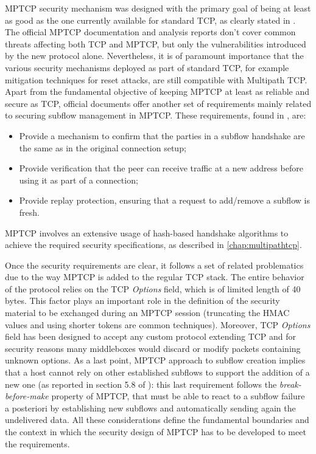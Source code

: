 MPTCP security mechanism was designed with the primary goal of being at least as good as the one currently available for standard TCP, as clearly stated in . The official MPTCP documentation and analysis reports don't cover common threats affecting both TCP and MPTCP, but only the vulnerabilities introduced by the new protocol alone. Nevertheless, it is of paramount importance that the various security mechanisms deployed as part of standard TCP, for example mitigation techniques for reset attacks, are still compatible with Multipath TCP. Apart from the fundamental objective of keeping MPTCP at least as reliable and secure as TCP, official documents offer another set of requirements mainly related to securing subflow management in MPTCP. These requirements, found in , are:
\begin{itemize} 
\item Provide a mechanism to confirm that the parties in a subflow handshake are the same as in the original connection setup;
\item Provide verification that the peer can receive traffic at a new address before using it as part of a connection;
\item Provide replay protection, ensuring that a request to add/remove a subflow is fresh.
\end{itemize}

MPTCP involves an extensive usage of hash-based handshake algorithms to achieve the required security specifications, as described in \autoref{chap:multipathtcp}. 

Once the security requirements are clear, it follows a set of related problematics due to the way MPTCP is added to the regular TCP stack. The entire behavior of the protocol relies on the TCP \textit{Options} field, which is of limited length of 40 bytes. This factor plays an important role in the definition of the security material to be exchanged during an MPTCP session (truncating the HMAC values and using shorter tokens are common techniques). Moreover, TCP \textit{Options} field has been designed to accept any custom protocol extending TCP and for security reasons many middleboxes would discard or modify packets containing unknown options. As a last point, MPTCP approach to subflow creation implies that a host cannot rely on other established subflows to support the addition of a new one (as reported in section 5.8 of ): this last requirement follows the \textit{break-before-make} property of MPTCP, that must be able to react to a subflow failure a posteriori by establishing new subflows and automatically sending again the undelivered data. All these considerations define the fundamental boundaries and the context in which the security design of MPTCP has to be developed to meet the requirements.

